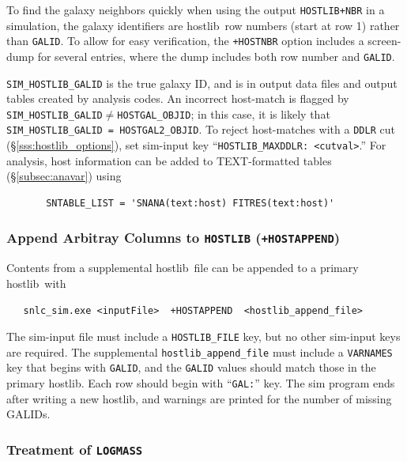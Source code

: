 \documentclass[12pt]{article}
\newcommand{\hostlib}{{\sc hostlib}}
\begin{document}
{To find the galaxy neighbors quickly when using the output 
{\tt HOSTLIB+NBR} in a simulation,
the galaxy identifiers are \hostlib\ row numbers (start at row 1)
rather than {\tt GALID}.
To allow for easy verification, the {\tt +HOSTNBR} option includes a 
screen-dump for several entries,
where the dump includes both row number and {\tt GALID}.

{\tt SIM\_HOSTLIB\_GALID} is the true galaxy ID, and is in 
output data files and output tables created by analysis codes.
An incorrect host-match is flagged by
{\tt SIM\_HOSTLIB\_GALID}$\ne${\tt HOSTGAL\_OBJID};
in this case, it is likely that
{\tt SIM\_HOSTLIB\_GALID = HOSTGAL2\_OBJID}.
To reject host-matches with a {\tt DDLR} cut
(\S\ref{sss:hostlib_options}),
set sim-input key ``{\tt HOSTLIB\_MAXDDLR: <cutval>}.''  
For analysis, host information can be added to TEXT-formatted
tables (\S\ref{subsec:anavar}) using 
\begin{verbatim}
       SNTABLE_LIST = 'SNANA(text:host) FITRES(text:host)'
\end{verbatim}

\subsubsection{Append Arbitray Columns to {\tt HOSTLIB} ({\tt +HOSTAPPEND})}
\label{sss:hostlib_append}

Contents from a supplemental \hostlib\ file can be appended to a
primary \hostlib\ with
\begin{verbatim}
   snlc_sim.exe <inputFile>  +HOSTAPPEND  <hostlib_append_file>
\end{verbatim} 
The sim-input file must include a {\tt HOSTLIB\_FILE} key,
but no other sim-input keys are required.
The supplemental {\tt hostlib\_append\_file} must include a
{\tt VARNAMES} key that begins with {\tt GALID}, and the
{\tt GALID} values should match those in the primary \hostlib.
Each row should begin with ``{\tt GAL:}'' key. 
The sim program ends after writing a new \hostlib,
and warnings are printed for the number of missing GALIDs.


\subsubsection{Treatment of {\tt LOGMASS} }
\label{sss:hostlib_logmass}

}
\end{document}
